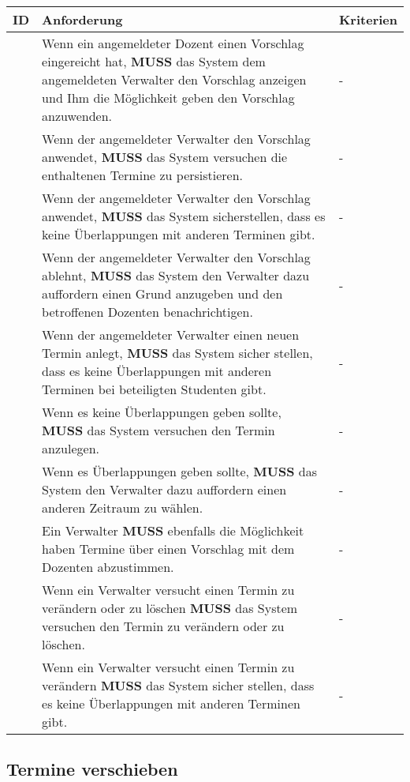 \begin{tabular} {|p{}|p{}|p{}|}
	\hline
	ID & Anforderung & Kriterien \\
	\hline
	\printfreqnr
	& Wenn ein angemeldeter Dozent einen Vorschlag eingereicht hat, \textbf{MUSS} das System dem angemeldeten Verwalter den Vorschlag anzeigen und Ihm die Möglichkeit geben den Vorschlag anzuwenden. 
	& - \\
	\hline
	\printfreqnr
	& Wenn der angemeldeter Verwalter den Vorschlag anwendet, \textbf{MUSS} das System versuchen die enthaltenen Termine zu persistieren.
	& - \\
	\hline
	\printfreqnr
	& Wenn der angemeldeter Verwalter den Vorschlag anwendet, \textbf{MUSS} das System sicherstellen, dass es keine Überlappungen mit anderen Terminen gibt.
	& - \\
	\hline
	\printfreqnr
	& Wenn der angemeldeter Verwalter den Vorschlag ablehnt, \textbf{MUSS} das System den Verwalter dazu auffordern einen Grund anzugeben und den betroffenen Dozenten benachrichtigen.
	& - \\
	\hline
	\printfreqnr
	& Wenn der angemeldeter Verwalter einen neuen Termin anlegt, \textbf{MUSS} das System sicher stellen, dass es keine Überlappungen mit anderen Terminen bei beteiligten Studenten gibt.
	& - \\
	\hline
	\printfreqnr
	& Wenn es keine Überlappungen geben sollte, \textbf{MUSS} das System versuchen den Termin anzulegen.
	& - \\
	\hline
	\printfreqnr
	& Wenn es Überlappungen geben sollte, \textbf{MUSS} das System den Verwalter dazu auffordern einen anderen Zeitraum zu wählen.
	& - \\
	\hline
	\printfreqnr
	& Ein Verwalter \textbf{MUSS} ebenfalls die Möglichkeit haben Termine über einen Vorschlag mit dem Dozenten abzustimmen.
	& - \\
	\hline
	\printfreqnr
	& Wenn ein Verwalter versucht einen Termin zu verändern oder zu löschen \textbf{MUSS} das System versuchen den Termin zu verändern oder zu löschen.
	& - \\
	\hline
	\printfreqnr
	& Wenn ein Verwalter versucht einen Termin zu verändern \textbf{MUSS} das System sicher stellen, dass es keine Überlappungen mit anderen Terminen gibt.
	& - \\
	\hline
\end{tabular}

\newpage

\subsection{Termine verschieben}

